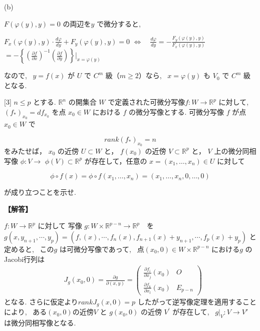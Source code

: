 \documentclass{jsarticle}
\begin{document}
\bigskip

\noindent
(b) 

$F(\varphi(y), y) = 0$ の両辺を$y$ で微分すると, 

$F_x (\varphi(y), y) \cdot \displaystyle \frac{d\varphi}{dy} + F_y (\varphi(y), y) = 0$ \quad
$\Longleftrightarrow \quad \displaystyle \frac{d\varphi}{dy} = -\frac{F_y (\varphi(y), y)}{F_x (\varphi(y), y)}$
$= -\left\{ \left(\displaystyle \frac{\partial f}{\partial x} \right)^{-1}  \left(\displaystyle \frac{\partial f}{\partial y} \right) \right\} \bigg|_{x= \varphi(y)}$

なので, \ $y = f(x)$ が $U$ で $C^m$ 級（$m \geq 2$）なら, \ $x = \varphi(y)$ も $V_0$ で $C^m$ 級となる.






\begin{itembox}[l]{[3]}
$n \le p$ とする. $\mathbb{R}^n$ の開集合 $W$ で定義された可微分写像$f : W \to \mathbb{R}^p$ に対して, \ $(f_*)_{x_0} = df_{x_0}$ を点 $x_0 \in W$ における $f$ の微分写像とする. 可微分写像 $f$ が点 $x_0 \in W$ で

$$rank (f_*)_{x_0} = n$$
をみたせば， $x_{0}$ の近傍 $U \subset W$ と， $f\left(x_{0}\right)$ の近傍 $V \subset \mathbb{R}^{p}$ と， $V$ 上の微分同相写像 $\phi: V \rightarrow$ $\phi(V) \subset \mathbb{R}^{p}$ が存在して，任意の $x=\left(x_{1}, \ldots, x_{n}\right) \in U$ に対して


\begin{equation*}
\phi \circ f(x)=\phi \circ f\left(x_{1}, \ldots, x_{n}\right)=\left(x_{1}, \ldots, x_{n}, 0, \ldots, 0\right) \tag{6}
\end{equation*}


が成り立つことを示せ.  
\end{itembox}

\noindent
\textbf{【解答】}

$f : W \rightarrow \mathbb{R}^{p}$ に対して
写像 $g: W \times \mathbb{R}^{p-n} \rightarrow \mathbb{R}^{p}$　を
$g\left(x, y_{n+1}, \cdots, y_{p}\right)=\left(f,(x), \cdots, f_{n}(x), f_{n+1}(x)+y_{n+1}, \cdots, f_{p}(x)+y_{p}\right)$
と定めると, \ この$g$ は可微分写像であって, \ 
点$(x_0, 0) \in W \times \mathbb{R}^{p-n}$ における$g$ のJacobi行列は 
$$
\begin{aligned}
& J_{g}\left(x_{0}, 0\right)=\frac{\partial g}{\partial(x, y)}=\left(\begin{array}{lc}
\displaystyle \frac{\partial f_{i}}{\partial x_{j}}\left(x_{0}\right) & O \\
\displaystyle \frac{\partial f_{k}}{\partial x_{l}}\left(x_{0}\right) & E_{p-n}
\end{array}\right)
\end{aligned}
$$
となる. さらに仮定より$rank J_g (x, 0) = p$
したがって逆写像定理を適用することにより, \ 
ある$\left(x_{0}, 0\right)$の近傍$V$ と $g\left(x_{0}, 0\right)$ の近傍 $V^{\prime}$ が存在して, \ $g|_V : V \to V'$ は微分同相写像となる.
\end{document}
